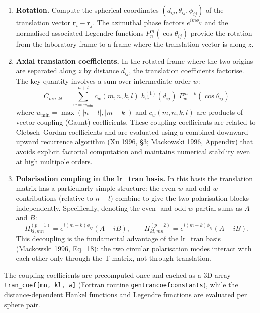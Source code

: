 \documentclass[11pt,a4paper]{article}
\begin{document}
\begin{enumerate}[nosep]
  \item \textbf{Rotation.}
  Compute the spherical coordinates $(d_{ij}, \theta_{ij}, \phi_{ij})$ of the translation vector $\bm{r}_i - \bm{r}_j$.
  The azimuthal phase factors $e^{im\phi_{ij}}$ and the normalised associated Legendre functions $P_n^m(\cos\theta_{ij})$ provide the rotation from the laboratory frame to a frame where the translation vector is along $z$.

  \item \textbf{Axial translation coefficients.}
  In the rotated frame where the two origins are separated along $z$ by distance $d_{ij}$, the translation coefficients factorise.
  The key quantity involves a sum over intermediate order $w$:
  \begin{equation}
    C_{mn,kl} = \sum_{w=w_\mathrm{min}}^{n+l} c_w(m,n,k,l) \; h_w^{(1)}(d_{ij}) \; P_w^{m-k}(\cos\theta_{ij})
    \label{eq:axial-translation}
  \end{equation}
  where $w_\mathrm{min} = \max(|n-l|, |m-k|)$ and $c_w(m,n,k,l)$ are products of vector coupling (Gaunt) coefficients.
  These coupling coefficients are related to Clebsch--Gordan coefficients and are evaluated using a combined downward--upward recurrence algorithm (Xu 1996, \S 3; Mackowski 1996, Appendix) that avoids explicit factorial computation and maintains numerical stability even at high multipole orders.

  \item \textbf{Polarisation coupling in the lr\_tran basis.}
  In this basis the translation matrix has a particularly simple structure: the even-$w$ and odd-$w$ contributions (relative to $n + l$) combine to give the two polarisation blocks independently.
  Specifically, denoting the even- and odd-$w$ partial sums as $A$ and $B$:
  \begin{equation}
    H_{kl,mn}^{(p=1)} = e^{i(m-k)\phi_{ij}} \left(A + iB\right), \qquad
    H_{kl,mn}^{(p=2)} = e^{i(m-k)\phi_{ij}} \left(A - iB\right).
    \label{eq:lr-translation}
  \end{equation}
  This decoupling is the fundamental advantage of the lr\_tran basis (Mackowski 1996, Eq.~18): the two circular polarisation modes interact with each other only through the T-matrix, not through translation.
\end{enumerate}

The coupling coefficients are precomputed once and cached as a 3D array \texttt{tran\_coef[mn, kl, w]} (Fortran routine \texttt{gentrancoefconstants}), while the distance-dependent Hankel functions and Legendre functions are evaluated per sphere pair.
\end{document}
